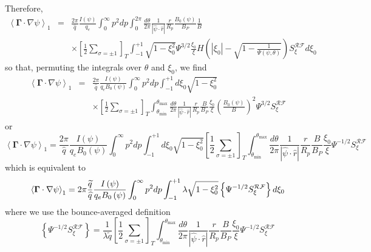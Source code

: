 Therefore,
\begin{eqnarray}
\left\langle \mathbf{\Gamma }\cdot \nabla \psi \right\rangle _{1} &=&\frac{
2\pi }{\widehat{q}}\frac{I\left( \psi \right) }{q_{e}}\int_{0}^{\infty
}p^{2}dp\int_{0}^{2\pi }\frac{d\theta }{2\pi }\frac{1}{\left| \widehat{\psi }
\cdot \widehat{r}\right| }\frac{r}{R_{p}}\frac{B_{0}\left( \psi \right) }{
B_{P}}\frac{1}{B}  \nonumber \\
&&\times \left[ \frac{1}{2}\sum_{\sigma =\pm 1}\right] _{T}\int_{-1}^{+1}%
\sqrt{1-\xi _{0}^{2}}\Psi ^{3/2}\frac{\xi _{0}}{\xi }H\left( \left| \xi
_{0}\right| -\sqrt{1-\frac{1}{\Psi \left( \psi ,\theta \right) }}\right)
S_{\xi }^{\mathcal{RF}}d\xi _{0}
\end{eqnarray}
so that, permuting the integrals over $\theta $ and $\xi _{0}$, we find
\begin{eqnarray}
\left\langle \mathbf{\Gamma }\cdot \nabla \psi \right\rangle _{1} &=&\frac{
2\pi }{\widehat{q}}\frac{I\left( \psi \right) }{q_{e}B_{0}\left( \psi
\right) }\int_{0}^{\infty }p^{2}dp\int_{-1}^{+1}d\xi _{0}\sqrt{1-\xi _{0}^{2}%
}  \nonumber \\
&&\times \left[ \frac{1}{2}\sum_{\sigma =\pm 1}\right] _{T}\int_{\theta
_{\min }}^{\theta _{\max }}\frac{d\theta }{2\pi }\frac{1}{\left| \widehat{
\psi }\cdot \widehat{r}\right| }\frac{r}{R_{p}}\frac{B}{B_{P}}\frac{\xi _{0}%
}{\xi }\left( \frac{B_{0}\left( \psi \right) }{B}\right) ^{2}\Psi
^{3/2}S_{\xi }^{\mathcal{RF}}
\end{eqnarray}
or
\begin{equation}
\left\langle \mathbf{\Gamma }\cdot \nabla \psi \right\rangle _{1}=\frac{2\pi
}{\widehat{q}}\frac{I\left( \psi \right) }{q_{e}B_{0}\left( \psi \right) }%
\int_{0}^{\infty }p^{2}dp\int_{-1}^{+1}d\xi _{0}\sqrt{1-\xi _{0}^{2}}\left[
\frac{1}{2}\sum_{\sigma =\pm 1}\right] _{T}\int_{\theta _{\min }}^{\theta
_{\max }}\frac{d\theta }{2\pi }\frac{1}{\left| \widehat{\psi }\cdot \widehat{
r}\right| }\frac{r}{R_{p}}\frac{B}{B_{P}}\frac{\xi _{0}}{\xi }\Psi
^{-1/2}S_{\xi }^{\mathcal{RF}}
\end{equation}
which is equivalent to
\begin{equation}
\left\langle \mathbf{\Gamma }\cdot \nabla \psi \right\rangle _{1}=2\pi \frac{%
\widetilde{q}}{\widehat{q}}\frac{I\left( \psi \right) }{q_{e}B_{0}\left(
\psi \right) }\int_{0}^{\infty }p^{2}dp\int_{-1}^{+1}\lambda \sqrt{1-\xi
_{0}^{2}}\left\{ \Psi ^{-1/2}S_{\xi }^{\mathcal{RF}}\right\} d\xi _{0}
\end{equation}
where we use the bounce-averaged definition
\begin{equation}
\left\{ \Psi ^{-1/2}S_{\xi }^{\mathcal{RF}}\right\} =\frac{1}{\lambda
\widetilde{q}}\left[ \frac{1}{2}\sum_{\sigma =\pm 1}\right] _{T}\int_{\theta
_{\min }}^{\theta _{\max }}\frac{d\theta }{2\pi }\frac{1}{\left| \widehat{
\psi }\cdot \widehat{r}\right| }\frac{r}{R_{p}}\frac{B}{B_{P}}\frac{\xi _{0}%
}{\xi }\Psi ^{-1/2}S_{\xi }^{\mathcal{RF}}
\end{equation}


